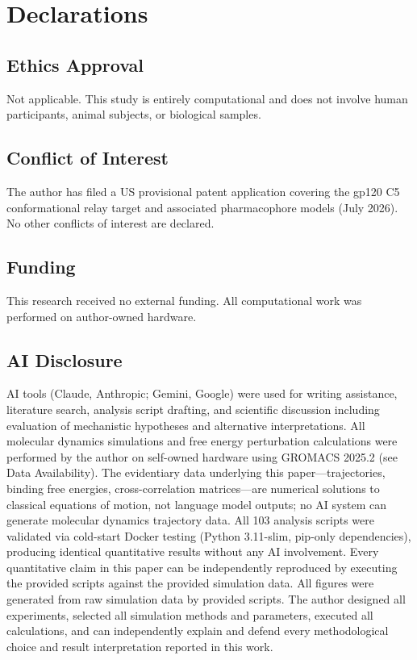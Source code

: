 \documentclass[11pt,a4paper]{article}
\begin{document}
\section{Declarations}

\subsection{Ethics Approval}

Not applicable. This study is entirely computational and does not involve human participants, animal subjects, or biological samples.

\subsection{Conflict of Interest}

The author has filed a US provisional patent application covering the gp120 C5 conformational relay target and associated pharmacophore models (July 2026). No other conflicts of interest are declared.

\subsection{Funding}

This research received no external funding. All computational work was performed on author-owned hardware.

\subsection{AI Disclosure}

AI tools (Claude, Anthropic; Gemini, Google) were used for writing assistance, literature search, analysis script drafting, and scientific discussion including evaluation of mechanistic hypotheses and alternative interpretations. All molecular dynamics simulations and free energy perturbation calculations were performed by the author on self-owned hardware using GROMACS 2025.2 (see Data Availability). The evidentiary data underlying this paper---trajectories, binding free energies, cross-correlation matrices---are numerical solutions to classical equations of motion, not language model outputs; no AI system can generate molecular dynamics trajectory data. All 103 analysis scripts were validated via cold-start Docker testing (Python 3.11-slim, pip-only dependencies), producing identical quantitative results without any AI involvement. Every quantitative claim in this paper can be independently reproduced by executing the provided scripts against the provided simulation data. All figures were generated from raw simulation data by provided scripts. The author designed all experiments, selected all simulation methods and parameters, executed all calculations, and can independently explain and defend every methodological choice and result interpretation reported in this work.
\end{document}
